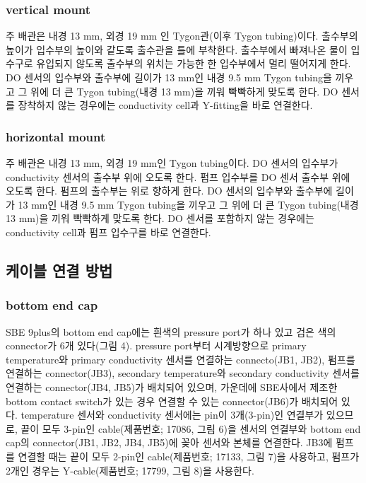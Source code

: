 \documentclass[
]{book}
\begin{document}
\hypertarget{vertical-mount}{%
\subsubsection{vertical mount}\label{vertical-mount}}

주 배관은 내경 13 mm, 외경 19 mm 인 Tygon관(이후 Tygon tubing)이다. 출수부의 높이가 입수부의 높이와 같도록 출수관을 틀에 부착한다. 출수부에서 빠져나온 물이 입수구로 유입되지 않도록 출수부의 위치는 가능한 한 입수부에서 멀리 떨어지게 한다. DO 센서의 입수부와 출수부에 길이가 13 mm인 내경 9.5 mm Tygon tubing을 끼우고 그 위에 더 큰 Tygon tubing(내경 13 mm)을 끼워 빡빡하게 맞도록 한다. DO 센서를 장착하지 않는 경우에는 conductivity cell과 Y-fitting을 바로 연결한다.

\hypertarget{horizontal-mount}{%
\subsubsection{horizontal mount}\label{horizontal-mount}}

주 배관은 내경 13 mm, 외경 19 mm인 Tygon tubing이다. DO 센서의 입수부가 conductivity 센서의 출수부 위에 오도록 한다. 펌프 입수부를 DO 센서 출수부 위에 오도록 한다. 펌프의 출수부는 위로 향하게 한다. DO 센서의 입수부와 출수부에 길이가 13 mm인 내경 9.5 mm Tygon tubing을 끼우고 그 위에 더 큰 Tygon tubing(내경 13 mm)을 끼워 빡빡하게 맞도록 한다. DO 센서를 포함하지 않는 경우에는 conductivity cell과 펌프 입수구를 바로 연결한다.

\hypertarget{uxcf00uxc774uxbe14-uxc5f0uxacb0-uxbc29uxbc95}{%
\subsection{케이블 연결 방법}\label{uxcf00uxc774uxbe14-uxc5f0uxacb0-uxbc29uxbc95}}

\hypertarget{bottom-end-cap}{%
\subsubsection{bottom end cap}\label{bottom-end-cap}}

SBE 9plus의 bottom end cap에는 흰색의 pressure port가 하나 있고 검은 색의 connector가 6개 있다(그림 4). pressure port부터 시계방향으로 primary temperature와 primary conductivity 센서를 연결하는 connecto(JB1, JB2), 펌프를 연결하는 connector(JB3), secondary temperature와 secondary conductivity 센서를 연결하는 connector(JB4, JB5)가 배치되어 있으며, 가운데에 SBE사에서 제조한 bottom contact switch가 있는 경우 연결할 수 있는 connector(JB6)가 배치되어 있다. temperature 센서와 conductivity 센서에는 pin이 3개(3-pin)인 연결부가 있으므로, 끝이 모두 3-pin인 cable(제품번호; 17086, 그림 6)을 센서의 연결부와 bottom end cap의 connector(JB1, JB2, JB4, JB5)에 꽂아 센서와 본체를 연결한다. JB3에 펌프를 연결할 때는 끝이 모두 2-pin인 cable(제품번호; 17133, 그림 7)을 사용하고, 펌프가 2개인 경우는 Y-cable(제품번호; 17799, 그림 8)을 사용한다.
\end{document}
